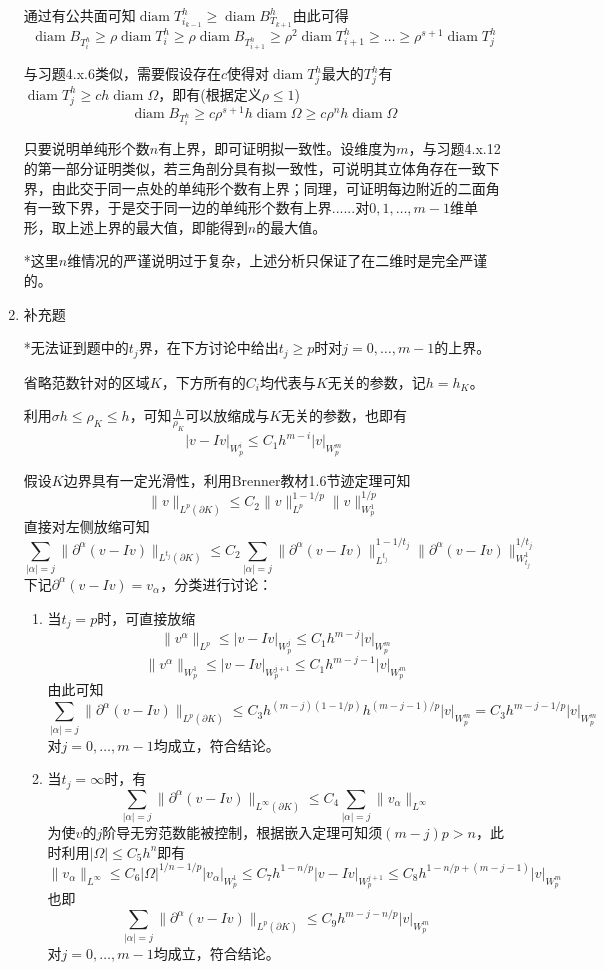 \documentclass[a4paper,UTF8,fontset=windows,10pt]{ctexart}
\DeclareMathOperator*{\diam}{diam}
\begin{document}
\begin{enumerate}
    通过有公共面可知$\diam T_{i_{k-1}}^h\ge\diam B_{T_{k+1}}^h$由此可得
    $$\diam B_{T_i^h}\ge\rho\diam T_i^h\ge\rho\diam B_{T_{i+1}^h}\ge\rho^2\diam T_{i+1}^h\ge\dots\ge\rho^{s+1}\diam T_j^h$$
    
    与习题4.x.6类似，需要假设存在$c$使得对$\diam T_j^h$最大的$T_j^h$有$\diam T_j^h\ge ch\diam\Omega$，即有(根据定义$\rho\le 1$)
    $$\diam B_{T_i^h}\ge c\rho^{s+1}h\diam\Omega\ge c\rho^nh\diam\Omega$$
    
    只要说明单纯形个数$n$有上界，即可证明拟一致性。设维度为$m$，与习题4.x.12的第一部分证明类似，若三角剖分具有拟一致性，可说明其立体角存在一致下界，由此交于同一点处的单纯形个数有上界；同理，可证明每边附近的二面角有一致下界，于是交于同一边的单纯形个数有上界......对$0,1,\dots,m-1$维单形，取上述上界的最大值，即能得到$n$的最大值。
    
    *这里$n$维情况的严谨说明过于复杂，上述分析只保证了在二维时是完全严谨的。
    
    \item 补充题
    
    *无法证到题中的$t_j$界，在下方讨论中给出$t_j\ge p$时对$j=0,\dots,m-1$的上界。
    
    省略范数针对的区域$K$，下方所有的$C_i$均代表与$K$无关的参数，记$h=h_K$。
    
    利用$\sigma h\le \rho_K\le h$，可知$\frac{h}{\rho_K}$可以放缩成与$K$无关的参数，也即有
    $$|v-Iv|_{W_p^i}\le C_1h^{m-i}|v|_{W_p^m}$$
    
    假设$K$边界具有一定光滑性，利用Brenner教材1.6节迹定理可知
    $$\|v\|_{L^p(\partial K)}\le C_2\|v\|_{L^p}^{1-1/p}\|v\|_{W_p^1}^{1/p}$$
    直接对左侧放缩可知
    $$\sum_{|\alpha|=j}\|\partial^\alpha(v-Iv)\|_{L^{t_j}(\partial K)}\le C_2\sum_{|\alpha|=j}\|\partial^\alpha(v-Iv)\|_{L^{t_j}}^{1-1/t_j}\|\partial^\alpha(v-Iv)\|_{W_{t_j}^1}^{1/t_j}$$
    下记$\partial^\alpha(v-Iv)=v_\alpha$，分类进行讨论：
    \begin{enumerate}
        \item 当$t_j=p$时，可直接放缩
        $$\|v^\alpha\|_{L^p}\le|v-Iv|_{W_p^j}\le C_1h^{m-j}|v|_{W_p^m}$$
        $$\|v^\alpha\|_{W_p^1}\le|v-Iv|_{W_p^{j+1}}\le C_1h^{m-j-1}|v|_{W_p^m}$$
        由此可知
        $$\sum_{|\alpha|=j}\|\partial^\alpha(v-Iv)\|_{L^p(\partial K)}\le C_3h^{(m-j)(1-1/p)}h^{(m-j-1)/p}|v|_{W_p^m}=C_3h^{m-j-1/p}|v|_{W_p^m}$$
        对$j=0,\dots,m-1$均成立，符合结论。
    
        \item 当$t_j=\infty$时，有
        $$\sum_{|\alpha|=j}\|\partial^\alpha(v-Iv)\|_{L^\infty(\partial K)}\le C_4\sum_{|\alpha|=j}\|v_\alpha\|_{L^\infty}$$
        为使$v$的$j$阶导无穷范数能被控制，根据嵌入定理可知须$(m-j)p>n$，此时利用$|\Omega|\le C_5h^n$即有
        $$\|v_\alpha\|_{L^\infty}\le C_6|\Omega|^{1/n-1/p}|v_\alpha|_{W_p^1}\le C_7h^{1-n/p}|v-Iv|_{W_p^{j+1}}\le C_8h^{1-n/p+(m-j-1)}|v|_{W_p^m}$$
        也即
        $$\sum_{|\alpha|=j}\|\partial^\alpha(v-Iv)\|_{L^p(\partial K)}\le C_9h^{m-j-n/p}|v|_{W_p^m}$$
        对$j=0,\dots,m-1$均成立，符合结论。
    

\end{enumerate}
\end{enumerate}
\end{document}
